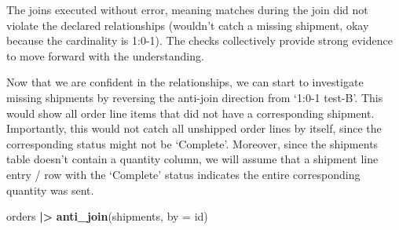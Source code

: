 \documentclass[
]{article}
\newenvironment{Shaded}{\begin{snugshade}}{\end{snugshade}}
\newcommand{\AttributeTok}[1]{\textcolor[rgb]{0.13,0.29,0.53}{#1}}
\newcommand{\FunctionTok}[1]{\textcolor[rgb]{0.13,0.29,0.53}{\textbf{#1}}}
\newcommand{\NormalTok}[1]{#1}
\newcommand{\SpecialCharTok}[1]{\textcolor[rgb]{0.81,0.36,0.00}{\textbf{#1}}}
\newcommand{\StringTok}[1]{\textcolor[rgb]{0.31,0.60,0.02}{#1}}
\begin{document}
The joins executed without error, meaning matches during the join did
not violate the declared relationships (wouldn't catch a missing
shipment, okay because the cardinality is 1:0-1). The checks
collectively provide strong evidence to move forward with the
understanding.

Now that we are confident in the relationships, we can start to
investigate missing shipments by reversing the anti-join direction from
`1:0-1 test-B'. This would show all order line items that did not have a
corresponding shipment. Importantly, this would not catch all unshipped
order lines by itself, since the corresponding status might not be
`Complete'. Moreover, since the shipments table doesn't contain a
quantity column, we will assume that a shipment line entry / row with
the `Complete' status indicates the entire corresponding quantity was
sent.

\begin{Shaded}
\begin{Highlighting}[]
\NormalTok{orders }\SpecialCharTok{|\textgreater{}} \FunctionTok{anti\_join}\NormalTok{(shipments, }\AttributeTok{by =} \StringTok{\textquotesingle{}id\textquotesingle{}}\NormalTok{)}
\end{Highlighting}
\end{Shaded}
\end{document}
